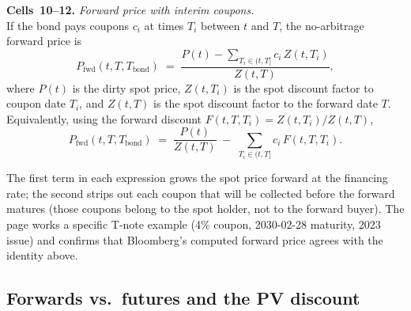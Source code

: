 \begin{keyblock}
\textbf{Cells~10--12.} \emph{Forward price with interim coupons.}\\
If the bond pays coupons $c_i$ at times $T_i$ between $t$ and $T$, the
no-arbitrage forward price is
\[
  P_{\text{fwd}}(t,T,T_{\text{bond}})
     \;=\; \frac{P(t) - \sum_{T_i \in (t,T]} c_i \, Z(t,T_i)}{Z(t,T)},
\]
where $P(t)$ is the dirty spot price, $Z(t,T_i)$ is the spot discount
factor to coupon date $T_i$, and $Z(t,T)$ is the spot discount factor to
the forward date $T$. Equivalently, using the forward discount
$F(t,T,T_i) = Z(t,T_i)/Z(t,T)$,
\[
  P_{\text{fwd}}(t,T,T_{\text{bond}})
     \;=\; \frac{P(t)}{Z(t,T)} \;-\; \sum_{T_i\in(t,T]} c_i\,F(t,T,T_i).
\]
\end{keyblock}

The first term in each expression grows the spot price forward at the
financing rate; the second strips out each coupon that will be collected
before the forward matures (those coupons belong to the spot holder, not
to the forward buyer). The page works a specific T-note example (4\%
coupon, 2030-02-28 maturity, 2023 issue) and confirms that Bloomberg's
computed forward price agrees with the identity above.

\subsection{Forwards vs.\ futures and the PV discount}\label{L4-sec:fwd-vs-fut}


